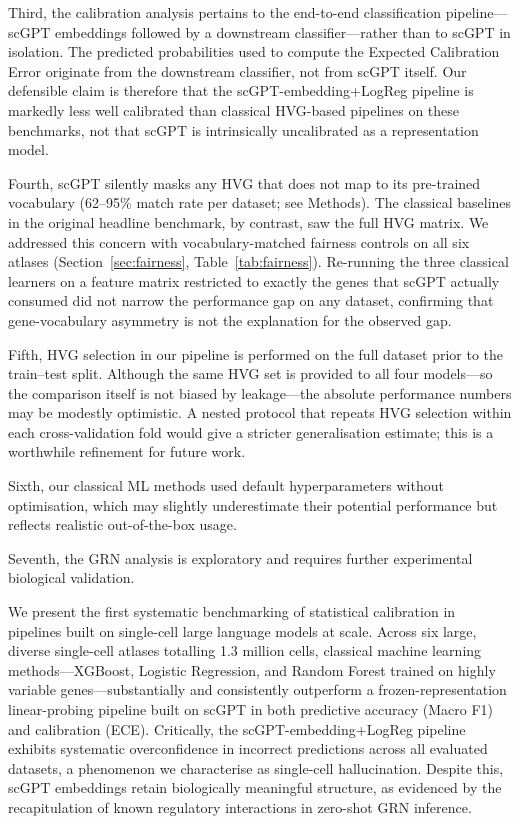 \documentclass[11pt,a4paper]{article}
\makeatletter
\renewcommand\section{\@startsection{section}{1}{\z@}{-3.5ex plus -1ex minus -.2ex}{2.3ex plus .2ex}{\normalfont\large\bfseries}}
\makeatother
\begin{document}
Third, the calibration analysis pertains to the end-to-end classification pipeline---scGPT embeddings followed by a downstream classifier---rather than to scGPT in isolation. The predicted probabilities used to compute the Expected Calibration Error originate from the downstream classifier, not from scGPT itself. Our defensible claim is therefore that the scGPT-embedding+LogReg pipeline is markedly less well calibrated than classical HVG-based pipelines on these benchmarks, not that scGPT is intrinsically uncalibrated as a representation model.

Fourth, scGPT silently masks any HVG that does not map to its pre-trained vocabulary (62--95\% match rate per dataset; see Methods). The classical baselines in the original headline benchmark, by contrast, saw the full HVG matrix. We addressed this concern with vocabulary-matched fairness controls on all six atlases (Section~\ref{sec:fairness}, Table~\ref{tab:fairness}). Re-running the three classical learners on a feature matrix restricted to exactly the genes that scGPT actually consumed did not narrow the performance gap on any dataset, confirming that gene-vocabulary asymmetry is not the explanation for the observed gap.

Fifth, HVG selection in our pipeline is performed on the full dataset prior to the train--test split. Although the same HVG set is provided to all four models---so the comparison itself is not biased by leakage---the absolute performance numbers may be modestly optimistic. A nested protocol that repeats HVG selection within each cross-validation fold would give a stricter generalisation estimate; this is a worthwhile refinement for future work.

Sixth, our classical ML methods used default hyperparameters without optimisation, which may slightly underestimate their potential performance but reflects realistic out-of-the-box usage.

Seventh, the GRN analysis is exploratory and requires further experimental biological validation.

\section{Conclusions}

We present the first systematic benchmarking of statistical calibration in pipelines built on single-cell large language models at scale. Across six large, diverse single-cell atlases totalling 1.3 million cells, classical machine learning methods---XGBoost, Logistic Regression, and Random Forest trained on highly variable genes---substantially and consistently outperform a frozen-representation linear-probing pipeline built on scGPT in both predictive accuracy (Macro F1) and calibration (ECE). Critically, the scGPT-embedding+LogReg pipeline exhibits systematic overconfidence in incorrect predictions across all evaluated datasets, a phenomenon we characterise as single-cell hallucination. Despite this, scGPT embeddings retain biologically meaningful structure, as evidenced by the recapitulation of known regulatory interactions in zero-shot GRN inference.
\end{document}
